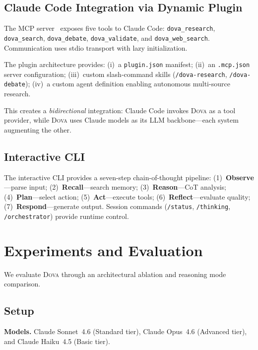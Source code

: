 \documentclass{article}
\theoremstyle{plain}
\theoremstyle{definition}
\newcommand{\dova}{\textsc{Dova}}
\begin{document}
\subsection{Claude Code Integration via Dynamic Plugin}\label{sec:claude_code}

The MCP server~\citep{anthropic2024mcp} exposes five tools to Claude Code:
\texttt{dova\_research}, \texttt{dova\_search}, \texttt{dova\_debate},
\texttt{dova\_validate}, and \texttt{dova\_web\_search}.  Communication uses
stdio transport with lazy initialization.

The plugin architecture provides:
(i)~a \texttt{plugin.json} manifest;
(ii)~an \texttt{.mcp.json} server configuration;
(iii)~custom slash-command skills (\texttt{/dova-research},
\texttt{/dova-debate});
(iv)~a custom agent definition enabling autonomous multi-source research.

This creates a \emph{bidirectional} integration: Claude Code invokes \dova{}
as a tool provider, while \dova{} uses Claude models as its LLM
backbone---each system augmenting the other.

\subsection{Interactive CLI}\label{sec:cli}

The interactive CLI provides a seven-step chain-of-thought pipeline:
(1)~\textbf{Observe}---parse input;
(2)~\textbf{Recall}---search memory;
(3)~\textbf{Reason}---CoT analysis;
(4)~\textbf{Plan}---select action;
(5)~\textbf{Act}---execute tools;
(6)~\textbf{Reflect}---evaluate quality;
(7)~\textbf{Respond}---generate output.
Session commands (\texttt{/status}, \texttt{/thinking}, \texttt{/orchestrator})
provide runtime control.

\section{Experiments and Evaluation}\label{sec:experiments}

We evaluate \dova{} through an architectural ablation and reasoning mode
comparison.

\subsection{Setup}

\textbf{Models.}\quad
Claude Sonnet~4.6 (Standard tier), Claude Opus~4.6 (Advanced tier),
and Claude Haiku~4.5 (Basic tier).
\end{document}
